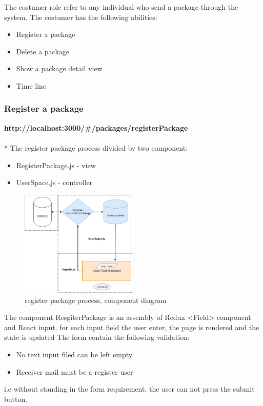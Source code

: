 The costumer role refer to any individual who send a package through the system.
The costumer has the following abilities:

\begin{itemize}
    \item Register a package
    \item Delete a package
    \item Show a package detail view 
    \item Time line
\end{itemize}


\subsubsection{Register a package}
\textbf{http://localhost:3000/\#/packages/registerPackage}\\
\\*
The register package process divided by two component:
\begin{itemize}
\item RegisterPackage.js - view 
\item UserSpace.js - controller 
\end{itemize}


\begin{figure}[!ht]
	\centering
	\includegraphics[width=0.5\textwidth]{images/register.jpg}
	\caption{register package process, component diagram}
	\label{fig:}
\end{figure}


The component ResgiterPackage is an assembly of Redux <Field> component and React input.
for each input field the user enter, the page is rendered and the state is updated
The form contain the following validation:
\begin{itemize}
\item No text input filed can be left empty 
\item Receiver mail must be a register user
\end{itemize}
i.e without standing in the form requirement, the user can not press the submit button.

